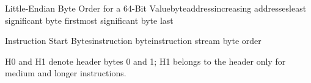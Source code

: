 \begin{manuallistedbyteorderdiagram}{Little-Endian Byte Order for a 64-Bit Value}{byte}{address}{increasing addresses}{least significant byte first}{most significant byte last}
\end{manuallistedbyteorderdiagram}

\begin{manuallistedbyteorderdiagram}{Instruction Start Bytes}{instruction byte}{}{instruction stream byte order}{}{}
\end{manuallistedbyteorderdiagram}

H0 and H1 denote header bytes 0 and 1; H1 belongs to the header only for medium and longer instructions.
